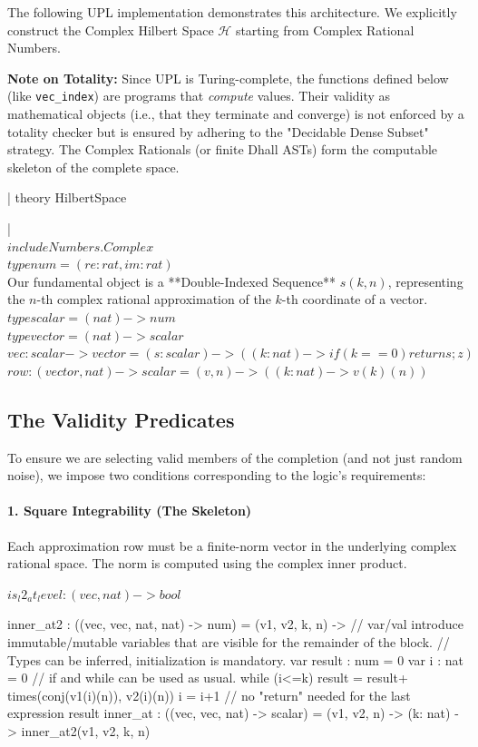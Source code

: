 \documentclass{stex}
\begin{document}
The following UPL implementation demonstrates this architecture. We explicitly construct the Complex Hilbert Space $\mathcal{H}$ starting from Complex Rational Numbers.

\textbf{Note on Totality:} Since UPL is Turing-complete, the functions defined below (like \texttt{vec\_index}) are programs that \textit{compute} values. Their validity as mathematical objects (i.e., that they terminate and converge) is not enforced by a totality checker but is ensured by adhering to the "Decidable Dense Subset" strategy. The Complex Rationals (or finite Dhall ASTs) form the computable skeleton of the complete space.
\begin{smodule}[id=Kopperman2]
\uplsetup
\uplinline|  theory HilbertSpace { | \\
\uplinline$    include Numbers.Complex $\\
\uplinline$    type num = (re: rat, im: rat) $\\
Our fundamental object is a **Double-Indexed Sequence** $s(k, n)$, representing the $n$-th complex rational approximation of the $k$-th coordinate of a vector.
\uplinline$    type scalar = (nat) -> num$\\
\uplinline$    type vector = (nat) -> scalar$\\
\uplinline$    vec : scalar -> vector = (s:scalar) -> ((k: nat) -> {if(k==0) return s; z})$\\
\uplinline$    row: (vector, nat) -> scalar = (v, n) -> ((k: nat) -> v(k)(n))$


\subsection{The Validity Predicates}

To ensure we are selecting valid members of the completion (and not just random noise), we impose two conditions corresponding to the logic's requirements:

\paragraph{1. Square Integrability (The Skeleton)}
Each approximation row must be a finite-norm vector in the underlying complex rational space. The norm is computed using the complex inner product.



\uplinline$    is_l2_at_level : (vec, nat) -> bool$\\
\begin{upl}
   inner_at2 : ((vec, vec, nat, nat) -> num) = (v1, v2, k, n) -> {
    // var/val introduce immutable/mutable variables that are visible for the remainder of the block.
    // Types can be inferred, initialization is mandatory.
    var result : num = 0
    var i : nat = 0
    // if and while can be used as usual.
    while (i<=k) {
      result = result+ times(conj(v1(i)(n)), v2(i)(n))
      i = i+1
    }
    // no "return" needed for the last expression
    result
  }
  inner_at : ((vec, vec, nat) -> scalar) = (v1, v2, n) -> (k: nat) -> inner_at2(v1, v2, k, n)
\end{upl}

}
\end{smodule}
\end{document}
